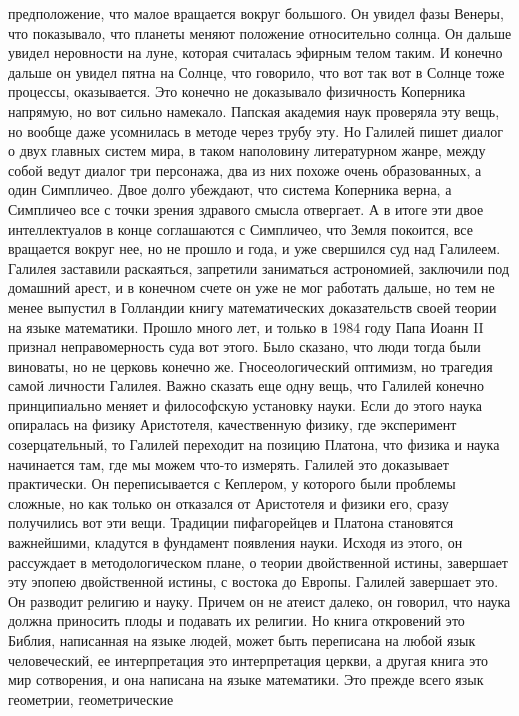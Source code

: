 \documentclass[a4paper, 12pt]{article}
\begin{document}
предположение, что малое вращается вокруг большого. Он увидел фазы 
Венеры, что показывало, что планеты меняют положение относительно 
солнца. Он дальше увидел неровности на луне, которая считалась эфирным 
телом таким. И конечно дальше он увидел пятна на Солнце, что говорило, 
что вот так вот в Солнце тоже процессы, оказывается. Это конечно не 
доказывало физичность Коперника напрямую, но вот сильно намекало. 
Папская академия наук проверяла эту вещь, но вообще даже усомнилась 
в методе через трубу эту. Но Галилей пишет диалог о двух главных систем 
мира, в таком наполовину литературном жанре, между собой ведут диалог 
три персонажа, два из них похоже очень образованных, а один Симпличео. 
Двое долго убеждают, что система Коперника верна, а Симпличео все 
с точки зрения здравого смысла отвергает. А в итоге эти двое 
интеллектуалов в конце соглашаются с Симпличео, что Земля покоится, все 
вращается вокруг нее, но не прошло и года, и уже свершился суд над 
Галилеем. Галилея заставили раскаяться, запретили заниматься 
астрономией, заключили под домашний арест, и в конечном счете он уже не 
мог работать дальше, но тем не менее выпустил в Голландии книгу 
математических доказательств своей теории на языке математики. Прошло 
много лет, и только в 1984 году Папа Иоанн II признал неправомерность 
суда вот этого. Было сказано, что люди тогда были виноваты, но не 
церковь конечно же. Гносеологический оптимизм, но трагедия самой 
личности Галилея. Важно сказать еще одну вещь, что Галилей конечно 
принципиально меняет и философскую установку науки. Если до этого наука 
опиралась на физику Аристотеля, качественную физику, где эксперимент 
созерцательный, то Галилей переходит на позицию Платона, что физика 
и наука начинается там, где мы можем что-то измерять. Галилей это 
доказывает практически. Он переписывается с Кеплером, у которого были 
проблемы сложные, но как только он отказался от Аристотеля и физики его, 
сразу получились вот эти вещи. Традиции пифагорейцев и Платона 
становятся важнейшими, кладутся в фундамент появления науки. Исходя из 
этого, он рассуждает в методологическом плане, о теории двойственной 
истины, завершает эту эпопею двойственной истины, с востока до Европы. 
Галилей завершает это. Он разводит религию и науку. Причем он не атеист 
далеко, он говорил, что наука должна приносить плоды и подавать их 
религии. Но книга откровений это Библия, написанная на языке людей, 
может быть переписана на любой язык человеческий, ее интерпретация это 
интерпретация церкви, а другая книга это мир сотворения, и она написана 
на языке математики. Это прежде всего язык геометрии, геометрические 
\end{document}
